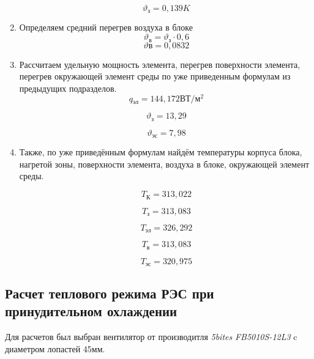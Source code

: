 \begin{enumerate}[label={\arabic*.}]
  $$\vartheta\mathrm{_з} = 0,139K$$

\item Определяем средний перегрев воздуха в блоке
  \begin{equation}
\vartheta\mathrm{_в} = \vartheta\mathrm{_з} \cdot 0,6
\end{equation}
$$\vartheta\mathrm{в} = 0,0832$$

\item Рассчитаем удельную мощность элемента, перегрев поверхности
элемента, перегрев окружающей элемент среды по уже приведенным формулам
из предыдущих подразделов.
$$q\mathrm{_{эл}}= 144,172\mathrm{ВТ/м^2}$$

$$\vartheta\mathrm{_{з}} = 13,29$$

$$\vartheta\mathrm{_{эс}} = 7,98$$

\item Также, по уже приведённым формулам найдём температуры корпуса
блока, нагретой зоны, поверхности элемента, воздуха в блоке, окружающей
элемент среды.

$$T\mathrm{_К} = 313,022$$

$$T\mathrm{_з} = 313,083$$

$$T\mathrm{_{эл}} = 326,292$$

$$T\mathrm{_{в}} = 313,083$$

$$T\mathrm{_{эс}} = 320,975$$

\end{enumerate}

\subsection{Расчет теплового режима РЭС при принудительном охлаждении}%

Для расчетов был выбран вентилятор от производитля \textit{5bites}
\textit{FB5010S-12L3} c диаметром лопастей 45мм.

